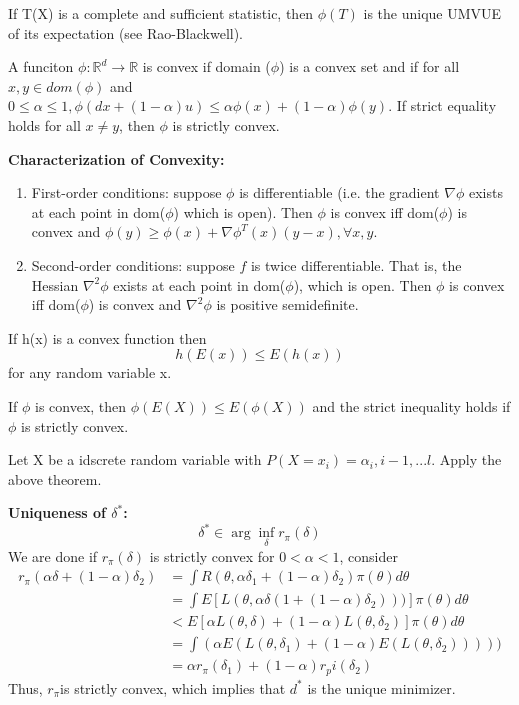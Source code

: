 \documentclass[11pt,fleqn]{book} %
\begin{document}
 \begin{theorem}
 	If T(X) is a complete and sufficient statistic, then $\phi(T)$ is the unique UMVUE of its expectation (see Rao-Blackwell).
 \end{theorem}

\begin{definition}
	A funciton $\phi: \mathbb{R}^d \rightarrow \mathbb{R}$ is convex if domain ($\phi$) is a convex set and if for all $x, y \in dom(\phi)$ and $0 \le \alpha \le 1, \phi(dx + (1-\alpha)u) \le \alpha \phi(x)+(1-\alpha)\phi(y).$ If strict equality holds for all $x\neq y$, then $\phi$ is strictly convex.
\end{definition}

\textbf{Characterization of Convexity:}
\begin{enumerate}
	\item First-order conditions: suppose $\phi$ is differentiable (i.e. the gradient $\nabla\phi$ exists at each point in dom($\phi$) which is open). Then $\phi$ is convex iff dom($\phi$) is convex and $\phi(y)\ge \phi(x) + \nabla\phi^T(x)(y-x), \forall x, y.$
	\item Second-order conditions: suppose $f$ is twice differentiable. That is, the Hessian $\nabla^2\phi$ exists at each point in dom($\phi$), which is open. Then $\phi$ is convex iff dom($\phi$) is convex and $\nabla^2\phi$ is positive semidefinite.
\end{enumerate}

 \begin{definition}
 If h(x) is a convex function then 
 $$h(E(x))\le E(h(x)) $$
for any random variable x.  	
 \end{definition}

\begin{theorem}
	If $\phi$ is convex, then $\phi(E(X)) \le E(\phi(X))$ and the strict inequality holds if $\phi$ is strictly convex.
\end{theorem}

\begin{corollary}
	Let X be a idscrete random variable with $P(X=x_i) = \alpha_i, i - 1,...l$. Apply the above theorem. 
\end{corollary}

\textbf{Uniqueness of $\delta^*$:} 
$$\delta^* \in \arg\inf_\delta r_\pi(\delta)$$
We are done if $r_\pi(\delta)$ is strictly convex for $0<\alpha<1$, consider 
\begin{align*}
	r_\pi(\alpha \delta + (1-\alpha)\delta_2) &= \int R(\theta, \alpha \delta_1 + (1-\alpha)\delta_2) \pi(\theta) d \theta\\
	&= \int E\left[L(\theta, \alpha \delta(1 + (1-\alpha)\delta_2)))\right]\pi(\theta) d \theta\\
	&< E\left[\alpha L(\theta, \delta) + (1-\alpha)L(\theta, \delta_2)\right]\pi(\theta) d \theta\\
	 &= \int(\alpha E(L(\theta, \delta_1)+(1-\alpha)E(L(\theta, \delta_2)))))\\
	 &= \alpha r_\pi(\delta_1) + (1-\alpha)r_pi(\delta_2)
\end{align*}	
Thus, $r_\pi$is strictly convex, which implies that $d^*$ is the unique minimizer. 
\end{document}
